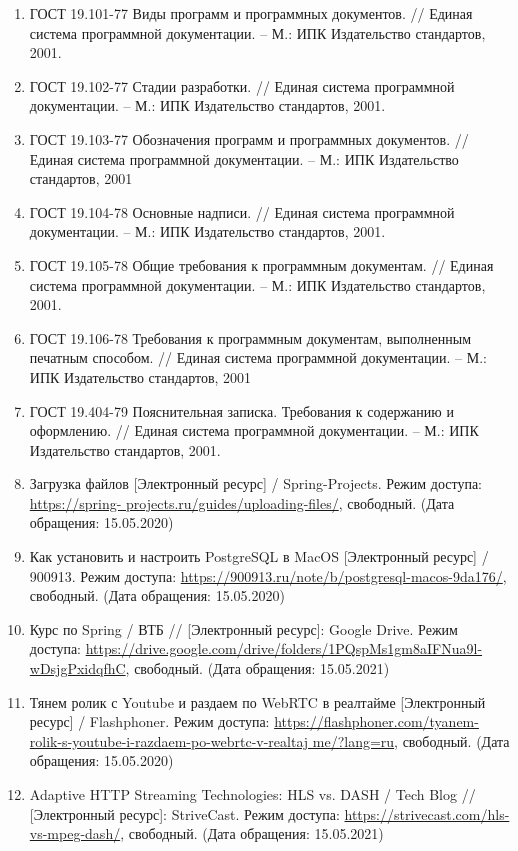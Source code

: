 \documentclass{../includes/TechDoc}
\begin{document}
    \begin{enumerate}
        \item ГОСТ 19.101-77 Виды программ и программных документов. // Единая система программной документации. – М.: ИПК Издательство стандартов, 2001.
        \item ГОСТ 19.102-77 Стадии разработки. // Единая система программной документации. – М.: ИПК Издательство стандартов, 2001.
        \item ГОСТ 19.103-77 Обозначения программ и программных документов. // Единая система программной документации. – М.: ИПК Издательство стандартов, 2001
        \item ГОСТ 19.104-78 Основные надписи. // Единая система программной документации. – М.: ИПК Издательство стандартов, 2001.
        \item ГОСТ 19.105-78 Общие требования к программным документам. // Единая система программной документации. – М.: ИПК Издательство стандартов, 2001.
        \item ГОСТ 19.106-78 Требования к программным документам, выполненным печатным способом. // Единая система программной документации. – М.: ИПК Издательство стандартов, 2001
        \item ГОСТ 19.404-79 Пояснительная записка. Требования к содержанию и оформлению. // Единая система программной документации. – М.: ИПК Издательство стандартов, 2001.
        \item Загрузка файлов [Электронный ресурс] / Spring-Projects. Режим доступа: \href{https://spring-projects.ru/guides/uploading-files/}{https://spring- projects.ru/guides/uploading-files/}, свободный. (Дата обращения: 15.05.2020)
        \item Как установить и настроить PostgreSQL в MacOS [Электронный ресурс] / 900913. Режим доступа: \url{https://900913.ru/note/b/postgresql-macos-9da176/}, свободный. (Дата обращения: 15.05.2020)
        \item Курс по Spring / ВТБ // [Электронный ресурс]: Google Drive. Режим доступа: \url{https://drive.google.com/drive/folders/1PQspMs1gm8aIFNua9l-wDsjgPxidqfhC}, свободный. (Дата обращения: 15.05.2021)
        \item Тянем ролик с Youtube и раздаем по WebRTC в реалтайме [Электронный ресурс] / Flashphoner. Режим доступа: \href{https://flashphoner.com/tyanem-rolik-s-youtube-i-razdaem-po-webrtc-v-realtajme/?lang=ru}{https://flashphoner.com/tyanem-rolik-s-youtube-i-razdaem-po-webrtc-v-realtaj me/?lang=ru}, свободный. (Дата обращения: 15.05.2020)
        \item Adaptive HTTP Streaming Technologies: HLS vs. DASH / Tech Blog // [Электронный ресурс]: StriveCast. Режим доступа: \url{https://strivecast.com/hls-vs-mpeg-dash/}, свободный. (Дата обращения: 15.05.2021)

\end{enumerate}
\end{document}
